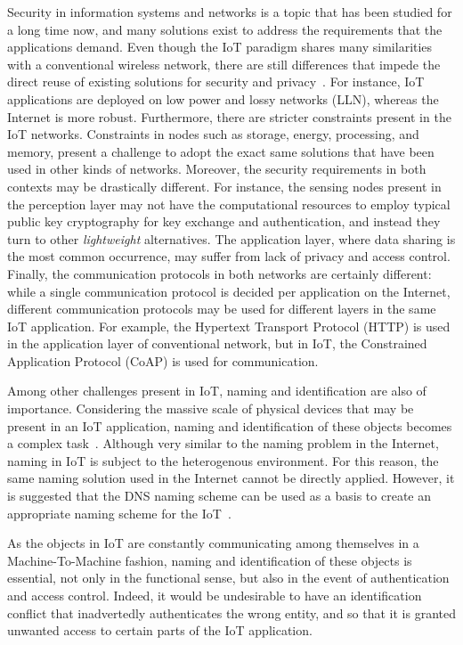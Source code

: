 \documentclass[12pt]{article}
\begin{document}
Security in information systems and networks is a topic that has been studied for a long time now, and many solutions exist to address the requirements that the applications demand. Even though the IoT paradigm shares many similarities with a conventional wireless network, there are still differences that impede the direct reuse of existing solutions for security and privacy~\cite{ALABA201710}. For instance, IoT applications are deployed on low power and lossy networks (LLN), whereas the Internet is more robust. Furthermore, there are stricter constraints present in the IoT networks. Constraints in nodes such as storage, energy, processing, and memory, present a challenge to adopt the exact same solutions that have been used in other kinds of networks. Moreover, the security requirements in both contexts may be drastically different. For instance, the sensing nodes present in the perception layer may not have the computational resources to employ typical public key cryptography for key exchange and authentication, and instead they turn to other \emph{lightweight} alternatives. The application layer, where data sharing is the most common occurrence, may suffer from lack of privacy and access control. Finally, the communication protocols in both networks are certainly different: while a single communication protocol is decided per application on the Internet, different communication protocols may be used for different layers in the same IoT application. For example, the Hypertext Transport Protocol (HTTP) is used in the application layer of conventional network, but in IoT, the Constrained Application Protocol (CoAP) is used for communication.

Among other challenges present in IoT, naming and identification are also of importance. Considering the massive scale of physical devices that may be present in an IoT application, naming and identification of these objects becomes a complex task~\cite{Zhang:2015}. Although very similar to the naming problem in the Internet, naming in IoT is subject to the heterogenous environment. For this reason, the same naming solution used in the Internet cannot be directly applied. However, it is suggested that the DNS naming scheme can be used as a basis to create an appropriate naming scheme for the IoT~\cite{Zhang:2015}. 

As the objects in IoT are constantly communicating among themselves in a Machine-To-Machine fashion, naming and identification of these objects is essential, not only in the functional sense, but also in the event of authentication and access control. Indeed, it would be undesirable to have an identification conflict that inadvertedly authenticates the wrong entity, and so that it is granted unwanted access to certain parts of the IoT application.
\end{document}
